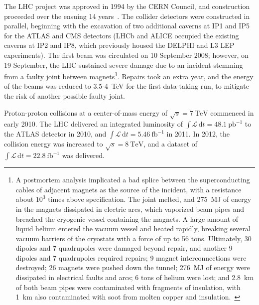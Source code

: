 The LHC project was approved in 1994 by the CERN Council, and construction proceeded over the ensuing 14 years~\cite{Evans:2010va}. The collider detectors were constructed in parallel, beginning with the excavation of two additional caverns at IP1 and IP5 for the ATLAS and CMS detectors (LHCb and ALICE occupied the existing caverns at IP2 and IP8, which previously housed the DELPHI and L3 LEP experiments). The first beam was circulated on 10 September 2008; however, on 19 September, the LHC sustained severe damage due to an incident stemming from a faulty joint between magnets\footnote{A postmortem analysis implicated a bad splice between the superconducting cables of adjacent magnets as the source of the incident, with a resistance about $10^3$ times above specification. The joint melted, and \SI{275}{\mega\joule} of energy in the magnets dissipated in electric arcs, which vaporized beam pipes and breached the cryogenic vessel containing the magnets. A large amount of liquid helium entered the vacuum vessel and heated rapidly, breaking several vacuum barriers of the cryostats with a force of up to 56 tons. Ultimately, 30 dipoles and 7 quadrupoles were damaged beyond repair, and another 9 dipoles and 7 quadrupoles required repairs; 9 magnet interconnections were destroyed; 26 magnets were pushed down the tunnel; \SI{276}{\mega\joule} of energy were dissipated in electrical faults and arcs; 6 tons of helium were lost; and \SI{2.8}{\kilo\meter} of both beam pipes were contaminated with fragments of insulation, with \SI{1}{\kilo\meter} also contaminated with soot from molten copper and insulation.~\cite{Rossi:2010el}}. Repairs took an extra year, and the energy of the beams was reduced to 3.5-\SI{4}{\tera\electronvolt} for the first data-taking run, to mitigate the risk of another possible faulty joint. 

Proton-proton collisions at a center-of-mass energy of $\sqrt{s}=\SI{7}{\tera\electronvolt}$ commenced in early 2010. The LHC delivered an integrated luminosity of $\int \mathcal{L}\, \mathrm{d}t=\SI{48.1}{\pico\barn\tothe{-1}}$ to the ATLAS detector in 2010, and $\int \mathcal{L}\, \mathrm{d}t=\SI{5.46}{\femto\barn\tothe{-1}}$ in 2011. In 2012, the collision energy was increased to $\sqrt{s}=\SI{8}{\tera\electronvolt}$, and a dataset of $\int \mathcal{L}\, \mathrm{d}t=\SI{22.8}{\femto\barn\tothe{-1}}$ was delivered. 

